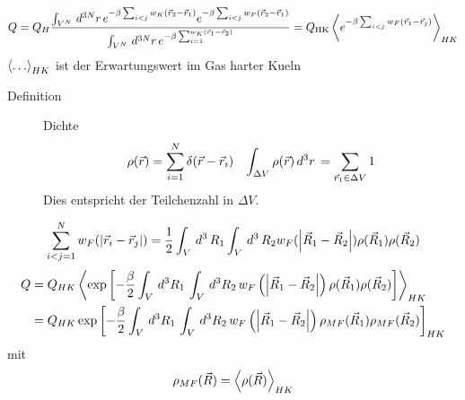%
%
\begin{align*}
  Q = Q_H \frac{\int_{V^N}^{} \,d^{3N}r\, e^{-\beta \sum_{i<j}^{} w_K \left( \vec{r}_2  - \vec{r}_1  \right) }   e ^{-\beta \sum_{ i<j }^{} w_F (\vec{r}_2 - \vec{r}_1)}   }{\int_{V^N}^{} \,d^{3N}r\, e ^{-\beta \sum_{i=1}^{w_K\left( \vec{r}_1 -\vec{r}_2 \right)}}}
  = Q_\text{HK} \Braket{ e ^{- \beta \sum_{i < j}^{} w_F (\vec{r}_1 - \vec{r}_j)}}_{HK}
\end{align*}
%
$\Braket{ \ldots }_{HK}$ ist der Erwartungswert im Gas harter Kueln
\begin{description}
  \item[Definition] Dichte
    \begin{align*}
      \rho(\vec{r}) = \sum_{i=1}^{N} \delta(\vec{r} - \vec{r}_i) &&
      \int_{\Delta V}^{} \rho (\vec{r}) \,d^3 r\, = \sum_{\vec{r}_1 \in
      \Delta V}^{} 1
    \end{align*}
    Dies entspricht der Teilchenzahl in $\Delta V$.
\end{description}

%
\begin{align*}
  \sum_{i < j = 1}^{N} w_F (|\vec{r}_i - \vec{r}_j|) = 
  \frac{1}{2} \int_{V}^{} \,d^3\, R_1 \int_{V}^{} \,d^3\, R_2 
  w_F (\left| \vec{R}_1 - \vec{R}_2 \right|) \rho(\vec{R}_1) \rho(\vec{R}_2)
\end{align*}
%
%
\begin{align*}
  Q & = Q_{HK} \Braket{ \exp{
    \left[ - \frac{\beta}{2} \int_{V}^{} \,d^3R_1\, \int_{V}^{} \,d^3 R_2\,
w_F \left( \left| \vec{R}_1- \vec{R}_2 \right|  \right) \rho(\vec{R}_1)\rho(\vec{R}_2)\right]}}_{HK} \\
& = Q_{HK}  \exp{
    \left[ - \frac{\beta}{2} \int_{V}^{} \,d^3R_1\, \int_{V}^{} \,d^3 R_2\,
w_F \left( \left| \vec{R}_1- \vec{R}_2 \right|  \right) \rho_{MF}(\vec{R}_1)\rho_{MF}(\vec{R}_2)\right]}_{HK}
\end{align*}
%
mit
%
\begin{align*}
  \rho_{MF}(\vec{R}) = \Braket{ \rho(\vec{R})}_{HK}
\end{align*}
%


